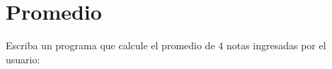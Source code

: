 \section{Promedio}

Escriba un programa que calcule el promedio de 4 notas ingresadas por el
usuario:
